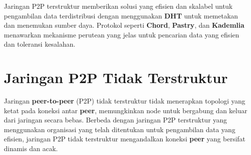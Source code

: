 Jaringan P2P terstruktur memberikan solusi yang efisien dan skalabel untuk pengambilan data terdistribusi dengan menggunakan \textbf{DHT} untuk memetakan dan menemukan sumber daya. Protokol seperti \textbf{Chord}, \textbf{Pastry}, dan \textbf{Kademlia} menawarkan mekanisme perutean yang jelas untuk pencarian data yang efisien dan toleransi kesalahan.

\section{Jaringan P2P Tidak Terstruktur}

Jaringan \textbf{peer-to-peer} (P2P) tidak terstruktur tidak menerapkan topologi yang ketat pada koneksi antar \textbf{peer}, memungkinkan node untuk bergabung dan keluar dari jaringan secara bebas. Berbeda dengan jaringan P2P terstruktur yang menggunakan organisasi yang telah ditentukan untuk pengambilan data yang efisien, jaringan P2P tidak terstruktur mengandalkan koneksi \textbf{peer} yang bersifat dinamis dan acak.

